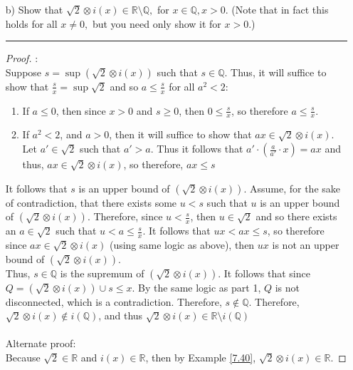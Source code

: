 \documentclass[openany, amssymb, psamsfonts]{amsart}
\newcommand{\bbQ}{\mathbb{Q}}
\newcommand{\bbR}{\mathbb{R}}
\newcommand{\sm}{\setminus}
\theoremstyle{definition}
\numberwithin{equation}{section}
\begin{document}
\begin{enumerate}
\begin{enumerate}
\begin{proof}
\begin{enumerate}
\end{enumerate}
Therefore, there does  not exist a $p\in \bbQ$ such that $\sqrt{2}= \{x\in \bbQ \mid x<p\}$
\end{proof}
\vspace{4pt}     \hrule   \vspace{4pt}

\item[b)] Show that $\sqrt{2} \otimes i(x)\in \bbR\setminus \bbQ,$ for $x\in\bbQ, x>0.$ (Note that in fact this holds for all $x\neq 0,$ but you need only show it for $x>0.$)
\vspace{4pt}     \hrule   \vspace{4pt}
\begin{proof}:\\
Suppose $s=\sup (\sqrt{2} \otimes i(x))$ such that $s\in \bbQ$. Thus, it will suffice to show that $\frac{s}{x} = \sup \sqrt{2}$ and so $a\leq \frac{s}{x}$ for all $a^2<2$:
\begin{enumerate} [1]
    \item If $a\leq 0$, then since $x>0$ and $s\geq 0$, then $0\leq \frac{s}{x}$, so therefore $a\leq \frac{s}{x}$.
    \item If $a^2<2$, and $a>0$, then it will suffice to show that $ax\in \sqrt{2}\otimes i(x)$. Let $a' \in \sqrt{2}$ such that $a'>a$. Thus it follows that $a'\cdot (\frac{a}{a'}\cdot x) = ax$ and thus, $ax \in \sqrt{2}\otimes i(x)$, so therefore, $ax\leq s$
\end{enumerate}
It follows that $s$ is an upper bound of $(\sqrt{2} \otimes i(x))$. Assume, for the sake of contradiction, that there exists some $u<s$ such that $u$ is an upper bound of $(\sqrt{2} \otimes i(x))$. Therefore, since $u< \frac{s}{x}$, then $u\in \sqrt{2}$ and so there exists an $a\in \sqrt{2}$ such that $u<a\leq \frac{s}{x}$. It follows that $ux<ax\leq s$, so therefore since $ax\in \sqrt{2} \otimes i(x)$ (using same logic as above), then $ux$ is not an upper bound of $(\sqrt{2} \otimes i(x))$.\\
Thus, $s\in \bbQ$ is the supremum of $(\sqrt{2} \otimes i(x))$. It follows that since $Q = (\sqrt{2} \otimes i(x)) \cup {s\leq x}$. By the same logic as part 1, $Q$ is not disconnected, which is a contradiction. Therefore, $s\notin \bbQ$. Therefore, $\sqrt{2}\otimes i(x) \notin i(\bbQ)$, and thus $\sqrt{2}\otimes i(x) \in \bbR \sm i(\bbQ)$
\\\\
Alternate proof:\\
    Because $\sqrt{2} \in \bbR$ and $i(x) \in \bbR$, then by Example \ref{7.40}, $\sqrt{2}\otimes i(x) \in \bbR$. 

\end{proof}
\end{enumerate}
\end{enumerate}
\end{document}
